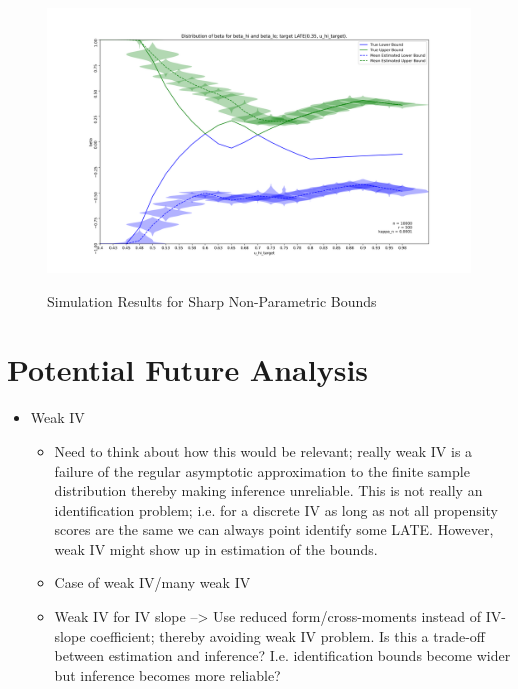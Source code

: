 \documentclass{article}
\begin{document}
\begin{figure}
    \caption{Simulation Results for Sharp Non-Parametric Bounds}
    \includegraphics[width = \textwidth]{graph/simulation_sharp_bounds_10000_500_0.0001.png}
    \label{fig:main_sim_violin}
\end{figure}

\clearpage
\newpage

\section{Potential Future Analysis}
\begin{itemize}
    \item Weak IV
    \begin{itemize}
        \item Need to think about how this would be relevant; really weak IV is a failure of the regular asymptotic approximation to the finite sample distribution
        thereby making inference unreliable. This is not really an identification problem; i.e. for a discrete IV as long as not all propensity scores are the same we can always point identify some LATE.
        However, weak IV might show up in estimation of the bounds.
        \item Case of weak IV/many weak IV
        \item Weak IV for IV slope --> Use reduced form/cross-moments instead of IV-slope coefficient;
        thereby avoiding weak IV problem. Is this a trade-off between estimation and inference? I.e. identification bounds become wider
        but inference becomes more reliable?
    \end{itemize}
\end{itemize} 

\printbibliography
\end{document}
